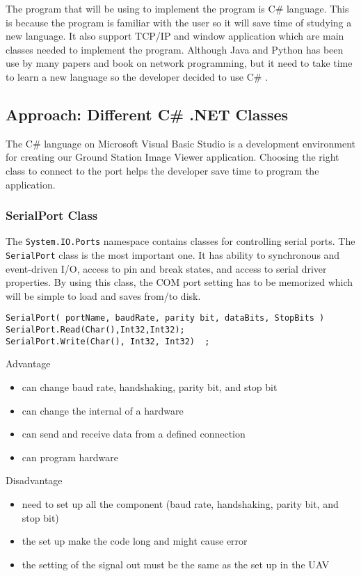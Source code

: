 The program that will be using to implement the program is C\# language. 
This is because the program is familiar with the user so it will save time of studying a new language.
It also support TCP/IP and window application which are main classes needed to implement the program.
Although Java and Python has been use by many papers and book on network programming, but it need to take time to learn a new language so the developer decided to use C\# \cite{normanM,guidoR,kennethC,elliotH}.

\subsection{Approach: Different C\# .NET Classes}
The C\# language on Microsoft Visual Basic Studio is a development environment for creating our Ground Station Image Viewer application. Choosing the right class to connect to the port helps the developer save time to program the application. 
 
\subsubsection{SerialPort Class}
The \texttt{System.IO.Ports} namespace contains classes for controlling serial ports. 
The \texttt{SerialPort} class is the most important one. It has ability to synchronous and event-driven I/O, access to pin and break states, and access to serial driver properties\cite{peak_netFrame}. 
By using this class, the COM port setting has to be memorized which will be simple to load and saves from/to disk.

\begin{lstlisting}[caption=Serial Port class connection\, read and write method, label=serialPortconn]
SerialPort( portName, baudRate, parity bit, dataBits, StopBits ) 
SerialPort.Read(Char(),Int32,Int32);
SerialPort.Write(Char(), Int32, Int32)	;
\end{lstlisting}


Advantage 
\begin{itemize}
\item can change baud rate, handshaking, parity bit, and stop bit
\item can change the internal of a hardware
\item can send and receive data from a defined connection
\item can program hardware
\end{itemize}
Disadvantage
\begin{itemize}
\item need to set up all the component (baud rate, handshaking, parity bit, and stop bit)
\item the set up make the code long and might cause error
\item the setting of the signal out must be the same as the set up in the UAV
\end{itemize}

